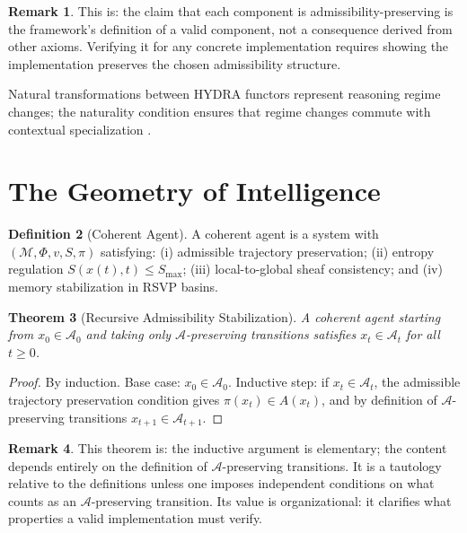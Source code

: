 \documentclass[12pt, a4paper]{article}
\theoremstyle{rsvpstyle}
\newtheorem{theorem}{Theorem}[section]
\theoremstyle{definition}
\newtheorem{definition}[theorem]{Definition}
\newtheorem{remark}[theorem]{Remark}
\newcommand{\OpMan}{\mathcal{M}}
\newcommand{\Adm}{\mathcal{A}}
\begin{document}
\begin{remark}
This is: the claim that each component is admissibility-preserving is the
framework's definition of a valid component, not a consequence derived from
other axioms. Verifying it for any concrete implementation requires showing the
implementation preserves the chosen admissibility structure.
\end{remark}

Natural transformations between HYDRA functors represent reasoning regime changes;
the naturality condition ensures that regime changes commute with contextual
specialization \citep{EilenbergMacLane1945}.

\section{The Geometry of Intelligence}

\begin{definition}[Coherent Agent]
A coherent agent is a system with $(\OpMan, \Phi, v, S, \pi)$ satisfying:
(i) admissible trajectory preservation; (ii) entropy regulation
$S(x(t),t) \leq S_\mathrm{max}$; (iii) local-to-global sheaf consistency;
and (iv) memory stabilization in RSVP basins.
\end{definition}

\begin{theorem}[Recursive Admissibility Stabilization]
\label{thm:ras}
A coherent agent starting from $x_0 \in \Adm_0$ and taking only
$\Adm$-preserving transitions satisfies $x_t \in \Adm_t$ for all $t \geq 0$.
\end{theorem}

\begin{proof}
By induction. Base case: $x_0 \in \Adm_0$. Inductive step: if $x_t \in \Adm_t$,
the admissible trajectory preservation condition gives $\pi(x_t) \in A(x_t)$,
and by definition of $\Adm$-preserving transitions $x_{t+1} \in \Adm_{t+1}$.
\end{proof}

\begin{remark}
This theorem is: the inductive argument is elementary; the
content depends entirely on the definition of $\Adm$-preserving transitions. It is a tautology relative to the definitions unless one imposes
independent conditions on what counts as an $\Adm$-preserving transition.
Its value is organizational: it clarifies what properties a valid implementation
must verify.
\end{remark}
\end{document}
